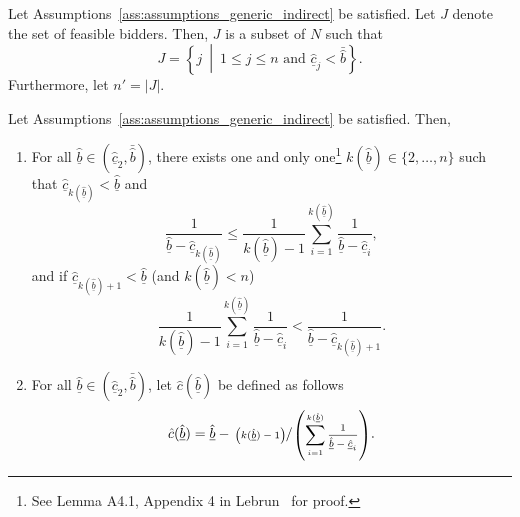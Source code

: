 \begin{define}
\label{def:feasible_bidders_indirect}
Let Assumptions~\ref{ass:assumptions_generic_indirect} be satisfied. Let $J$ denote the set of feasible bidders. Then, $J$ is a subset of $N$ such that
\begin{equation*}
  J = \left\{j \:\middle\vert\: 1\leq j\leq n \text{ and } \underline{\hat{c}}_j < \bar{\hat{b}}\right\}.
\end{equation*}
Furthermore, let $n' = |J|$.
\end{define}

\begin{define}
\label{def:lower_bound_bids_indirect}
Let Assumptions~\ref{ass:assumptions_generic_indirect} be satisfied. Then,
\begin{enumerate}
  \item For all $\underline{\hat{b}}\in (\underline{\hat{c}}_2, \bar{\hat{b}})$, there exists one and only one\footnote{See Lemma A4.1, Appendix 4 in Lebrun~\cite{Lebrun2004} for proof.} $k(\underline{\hat{b}})\in \{2,\dotsc,n\}$ such that $\underline{\hat{c}}_{k(\underline{\hat{b}})} < \underline{\hat{b}}$ and
  \begin{equation*}
    \frac{1}{\underline{\hat{b}} - \underline{\hat{c}}_{k(\underline{\hat{b}})}}\leq \frac{1}{k(\underline{\hat{b}}) - 1}\sum_{i=1}^{k(\underline{\hat{b}})}\frac{1}{\underline{\hat{b}} - \underline{\hat{c}}_i},
  \end{equation*}
  and if $\underline{\hat{c}}_{k(\underline{\hat{b}})+1} < \underline{\hat{b}}$ (and $k(\underline{\hat{b}}) < n$)
  \begin{equation*}
    \frac{1}{k(\underline{\hat{b}}) - 1}\sum_{i=1}^{k(\underline{\hat{b}})}\frac{1}{\underline{\hat{b}} - \underline{\hat{c}}_i} < \frac{1}{\underline{\hat{b}} - \underline{\hat{c}}_{k(\underline{\hat{b}})+1}}.
  \end{equation*}
  \item For all $\underline{\hat{b}}\in (\underline{\hat{c}}_2, \bar{\hat{b}})$, let $\hat{c}(\underline{\hat{b}})$ be defined as follows
  \begin{equation}
  \label{eq:lower_bound_bids_cost_indirect}
    \hat{c}(\underline{\hat{b}}) = \underline{\hat{b}} - \sfrac{\left(k(\underline{\hat{b}})-1\right)}{\left(\sum_{i=1}^{k(\underline{\hat{b}})} \frac{1}{\underline{\hat{b}} - \underline{\hat{c}}_i}\right)}.
  \end{equation}
\end{enumerate}
\end{define}
